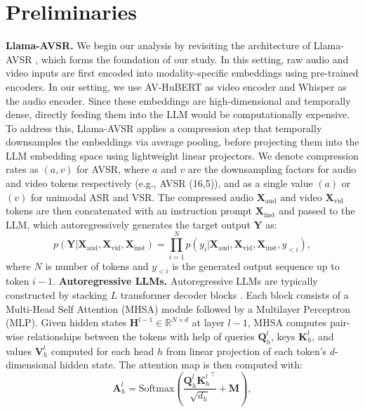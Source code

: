 \documentclass{article}
\begin{document}
\section{Preliminaries}
\label{sec:preliminaries}
\textbf{Llama-AVSR.} We begin our analysis by revisiting the architecture of Llama-AVSR \cite{cappellazzo2025large}, which forms the foundation of our study. In this setting, raw audio and video inputs are first encoded into modality-specific embeddings using pre-trained encoders. In our setting, we use AV-HuBERT \cite{shi2022learning} as video encoder and Whisper \cite{radford2023robust} as the audio encoder. Since these embeddings are high-dimensional and temporally dense, directly feeding them into the LLM would be computationally expensive. To address this, Llama-AVSR applies a compression step that temporally downsamples the embeddings via average pooling, before projecting them into the LLM embedding space using lightweight linear projectors. We denote compression rates as $(a,v)$ for AVSR, where $a$ and $v$ are the downsampling factors for audio and video tokens respectively (e.g., AVSR (16,5)), and as a single value $(a)$ or $(v)$ for unimodal ASR and VSR. The compressed audio $\mathbf{X}_{\text{aud}}$ and video $\mathbf{X}_{\text{vid}}$ tokens are then concatenated with an instruction prompt $\mathbf{X}_{\text{inst}}$ and passed to the LLM, which autoregressively generates the target output $\mathbf{Y}$ as:
\begin{equation}
p(\mathbf{Y}|\mathbf{X}_{\text{aud}}, \mathbf{X}_{\text{vid}}, \mathbf{X}_{\text{inst}})
= \prod_{i=1}^{N} p(y_i|\mathbf{X}_{\text{aud}}, \mathbf{X}_{\text{vid}}, \mathbf{X}_{\text{inst}}, y_{<i}),
\end{equation}
where $N$ is number of tokens and $y_{<i}$ is the generated output sequence up to token $i-1$.
\newline
\newline
\noindent\textbf{Autoregressive LLMs.} Autoregressive LLMs are typically constructed by stacking $L$ transformer decoder blocks \cite{vaswani2017attention}. Each block consists of a Multi-Head Self Attention (MHSA) module followed by a Multilayer Perceptron (MLP). Given hidden states $\textbf{H}^{l-1}\in\mathbb{R}^{N\times d}$ at layer $l-1$, MHSA computes pair-wise relationships between the tokens with help of queries $\textbf{Q}_h^l$, keys $\textbf{K}_h^l$, and values $\textbf{V}_h^l$ computed for each head $h$ from linear projection of each token's $d$-dimensional hidden state. The attention map is then computed with:
\begin{equation}
    \textbf{A}_h^l = \text{Softmax}\left(\frac{\textbf{Q}_h^l{\textbf{K}_h^l}^\top}{\sqrt{d_h}} + \textbf{M}\right),
\end{equation}
\end{document}
